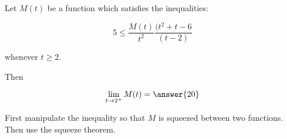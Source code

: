 \documentclass{ximera}
\author{Steven Gubkin}
\begin{document}
\begin{exercise}


	Let $M(t)$ be a function which satisfies the inequalities:
	
	\[
		5 \leq \frac{M(t)}{t^2} \frac{(t^2+t-6}{(t-2)} 
	\]
	
	whenever $t \geq 2$.
	
	Then 
	
	\[
	\lim_{t \to 2^+} M(t)  =  \answer{20}
	\]
	
	\begin{hint}
		First manipulate the inequality so that $M$ is squeezed between two functions.  Then use the squeeze theorem.
	\end{hint}

\end{exercise}
\end{document}
